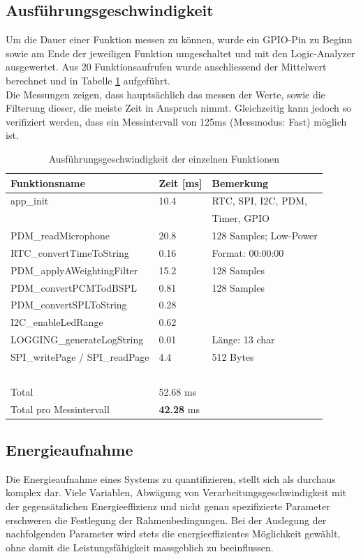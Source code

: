 \documentclass[12pt]{article}
\begin{document}
	\subsection{Ausführungsgeschwindigkeit}
	Um die Dauer einer Funktion messen zu können, wurde ein GPIO-Pin zu Beginn sowie am Ende der jeweiligen Funktion umgeschaltet und mit den Logic-Analyzer ausgewertet. Aus 20 Funktionsaufrufen wurde anschliessend der Mittelwert berechnet und in Tabelle \ref{tab:ausfuehrungsgeschwindigkeit} aufgeführt. \\
	Die Messungen zeigen, dass hauptsächlich das messen der Werte, sowie die Filterung dieser, die meiste Zeit in Anspruch nimmt. Gleichzeitig kann jedoch so verifiziert werden, dass ein Messintervall von 125ms (Messmodus: Fast) möglich ist.
	\begin{table}[H]
		\centering
		\begin{tabular}{|l|l|l|}
			\hline
			\textbf{Funktionsname} & \textbf{Zeit [ms]} & \textbf{Bemerkung} \\ \hline
			app\_init & 10.4 & RTC, SPI, I2C, PDM, \\ 
			 ~ & ~ & Timer, GPIO \\ 
			 \hline
			PDM\_readMicrophone & 20.8 & 128 Samples; Low-Power \\ \hline
			RTC\_convertTimeToString & 0.16 & Format: 00:00:00 \\ \hline
			PDM\_applyAWeightingFilter & 15.2 & 128 Samples \\ \hline
			PDM\_convertPCMTodBSPL & 0.81 & 128 Samples \\ \hline
			PDM\_convertSPLToString & 0.28 & ~ \\ \hline
			I2C\_enableLedRange & 0.62 & ~ \\ \hline
			LOGGING\_generateLogString & 0.01 & Länge: 13 char \\ \hline
			SPI\_writePage / SPI\_readPage & 4.4 & 512 Bytes \\ \hline
			~ & ~ & ~ \\ \hline
			Total & 52.68 ms & ~ \\ \hline
			Total pro Messintervall & \textbf{42.28} ms & ~ \\ \hline
		\end{tabular}
		\caption{Ausführungsgeschwindigkeit der einzelnen Funktionen}
		\label{tab:ausfuehrungsgeschwindigkeit}
	\end{table}
	\subsection{Energieaufnahme}
	Die Energieaufnahme eines Systems zu quantifizieren, stellt sich als durchaus komplex dar. Viele Variablen, Abwägung von Verarbeitungsgeschwindigkeit mit der gegensätzlichen Energieeffizienz und nicht genau spezifizierte Parameter erschweren die Festlegung der Rahmenbedingungen. Bei der Auslegung der nachfolgenden Parameter wird stets die energieeffizientes Möglichkeit gewählt, ohne damit die Leistungsfähigkeit massgeblich zu beeinflussen.
\end{document}

